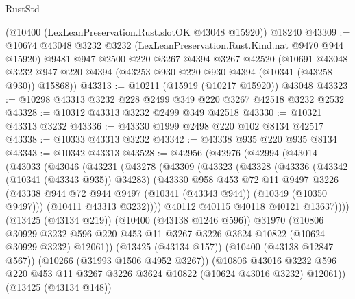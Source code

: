 \begin{lexlean}{RustStd}
\begin{coremodule}
    (@10400 (LexLeanPreservation.Rust.slotOK @43048 @15920))
    @18240
@43309 := @10674
    @43048
    @3232
    @3232
    (LexLeanPreservation.Rust.Kind.nat @9470 @944 @15920)
    @9481
    @947
    @2500
    @220
    @3267
    @4394
    @3267
    @42520
    (@10691
      @43048
      @3232
      @947
      @220
      @4394
      (@43253 @930 @220 @930 @4394 (@10341 (@43258 @930)) @15868))
@43313 := @10211 (@15919 (@10217 @15920)) @43048
@43323 := @10298 @43313 @3232 @228 @2499 @349 @220 @3267 @42518 @3232 @2532
@43328 := @10312 @43313 @3232 @2499 @349 @42518
@43330 := @10321 @43313 @3232
@43336 := @43330 @1999 @2498 @220 @102 @8134 @42517
@43338 := @10333 @43313 @3232
@43342 := @43338 @935 @220 @935 @8134
@43343 := @10342 @43313
@43528 := @42956
    (@42976
      (@42994
        (@43014
          (@43033
            (@43046
              (@43231
                (@43278
                  (@43309
                    (@43323
                      (@43328
                        (@43336
                          (@43342 (@10341 (@43343 @935)) @34283)
                          (@43330
                            @958
                            @453
                            @72
                            @11
                            @9497
                            @3226
                            (@43338
                              @944
                              @72
                              @944
                              @9497
                              (@10341 (@43343 @944))
                              (@10349 (@10350 @9497)))
                            (@10411 @43313 @3232))))
                      @40112
                      @40115
                      @40118
                      @40121
                      @13637))))
              (@13425 (@43134 @219))
              (@10400 (@43138 @1246 @596))
              @31970
              (@10806
                @30929
                @3232
                @596
                @220
                @453
                @11
                @3267
                @3226
                @3624
                @10822
                (@10624 @30929 @3232)
                @12061))
            (@13425 (@43134 @157))
            (@10400 (@43138 @12847 @567))
            (@10266 (@31993 @1506 @4952 @3267))
            (@10806
              @43016
              @3232
              @596
              @220
              @453
              @11
              @3267
              @3226
              @3624
              @10822
              (@10624 @43016 @3232)
              @12061))
          (@13425 (@43134 @148))

\end{coremodule}
\end{lexlean}
